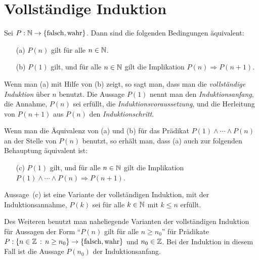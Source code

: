 

\section{Vollständige Induktion}

\begin{framed} 
Sei $P : \mathbb N \to \{ \operatorname{falsch}, \operatorname{wahr} \}$. Dann sind die folgenden Bedingungen äquivalent:
  \begin{itemize}
  	\item[(a)] $P(n)$ gilt für alle $n \in \mathbb N$.
  	\item[(b)] $P(1)$ gilt, und für alle $n \in \mathbb N$ gilt die Implikation $P(n) \Rightarrow P(n+1)$. 
  \end{itemize} 
\end{framed} 

Wenn man (a) mit Hilfe von (b) zeigt, so sagt man, dass man die \emph{vollständige Induktion} über $n$ benutzt. Die Aussage $P(1)$ nennt man den \emph{Induktionsanfang}, die Annahme, $P(n)$ sei erfüllt, die \emph{Induktionsvoraussetzung}, und die Herleitung von $P(n+1)$ aus $P(n)$ den \emph{Induktionschritt}. 

Wenn man die Äquivalenz von (a) und (b) für das Prädikat $P(1) \wedge \cdots \wedge P(n)$ an der Stelle von $P(n)$ benutzt, so erhält man, dass (a) auch zur folgenden Behauptung äquivalent ist: 

\begin{itemize}
	\item[(c)] $P(1)$ gilt, und für alle $n \in \mathbb N$ gilt die Implikation $P(1) \wedge \cdots \wedge P(n) \Rightarrow P(n+1)$. 
\end{itemize} 

Aussage~(c) ist eine Variante der vollständigen Induktion, mit der Induktionsannahme, $P(k)$ sei für alle $k \in \mathbb N$ mit $k \le n$ erfüllt. 

Des Weiteren benutzt man naheliegende Varianten der vollständigen Induktion für Aussagen der Form ``$P(n)$ gilt für alle $n \ge n_0$'' für Prädikate $P : \{ n \in \mathbb Z \,:\, n \ge n_0\} \to \{ \operatorname{falsch}, \operatorname{wahr} \}$ und $n_0 \in \mathbb Z$. Bei der Induktion in diesem Fall ist die Aussage $P(n_0)$ der Induktionsanfang. 

